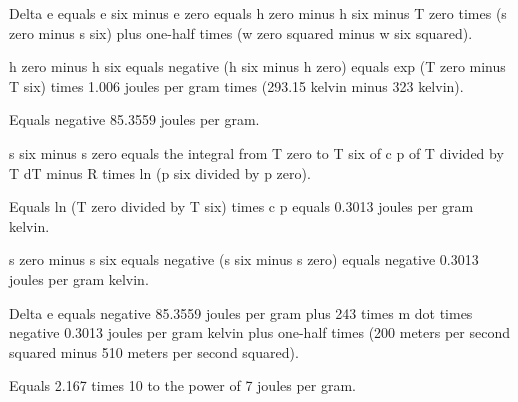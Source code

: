 Delta e equals e six minus e zero equals h zero minus h six minus T zero times (s zero minus s six) plus one-half times (w zero squared minus w six squared).  

h zero minus h six equals negative (h six minus h zero) equals exp (T zero minus T six) times 1.006 joules per gram times (293.15 kelvin minus 323 kelvin).  

Equals negative 85.3559 joules per gram.  

s six minus s zero equals the integral from T zero to T six of c p of T divided by T dT minus R times ln (p six divided by p zero).  

Equals ln (T zero divided by T six) times c p equals 0.3013 joules per gram kelvin.  

s zero minus s six equals negative (s six minus s zero) equals negative 0.3013 joules per gram kelvin.  

Delta e equals negative 85.3559 joules per gram plus 243 times m dot times negative 0.3013 joules per gram kelvin plus one-half times (200 meters per second squared minus 510 meters per second squared).  

Equals 2.167 times 10 to the power of 7 joules per gram.